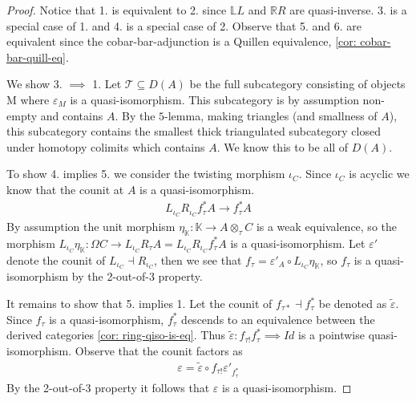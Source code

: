 \documentclass[../thesis.tex]{subfiles}
\begin{document}
            \begin{proof}
                Notice that 1. is equivalent to 2. since $\mathbb{L}L$ and $\mathbb{R}R$ are quasi-inverse. 3. is a special case of 1. and 4. is a special case of 2. Observe that 5. and 6. are equivalent since the cobar-bar-adjunction is a Quillen equivalence, \ref{cor: cobar-bar-quill-eq}.

                We show 3. $\implies$ 1. Let $\mathcal{T}\subseteq D(A)$ be the full subcategory consisting of objects M where $\varepsilon_M$ is a quasi-isomorphism. This subcategory is by assumption non-empty and contains $A$. By the $5$-lemma, making triangles (and smallness of $A$), this subcategory contains the smallest thick triangulated subcategory closed under homotopy colimits which contains $A$. We know this to be all of $D(A)$.

                To show 4. implies 5. we consider the twisting morphism $\iota_C$. Since $\iota_C$ is acyclic we know that the counit at $A$ is a quasi-isomorphism. 
                \begin{align*}
                    L_{\iota_C}R_{\iota_C}f_{\tau}^*A \rightarrow f_\tau^*A
                \end{align*}
                By assumption the unit morphism $\eta_\mathbb{K} : \mathbb{K} \rightarrow A \otimes_\tau C$ is a weak equivalence, so the morphism $L_{\iota_C}\eta_\mathbb{K} : \Omega C \rightarrow L_{\iota_C}R_\tau A = L_{\iota_C}R_{\iota_C}f_\tau^* A$ is a quasi-isomorphism. Let $\varepsilon'$ denote the counit of $L_{\iota_C} \dashv R_{\iota_C}$, then we see that $f_\tau = \varepsilon'_A \circ L_{\iota_C}\eta_\mathbb{K}$, so $f_\tau$ is a quasi-isomorphism by the 2-out-of-3 property.

                It remains to show that 5. implies 1. Let the counit of $f_{\tau *} \dashv f_\tau^*$ be denoted as $\tilde{\varepsilon}$. Since $f_\tau$ is a quasi-isomorphism, $f_\tau^*$ descends to an equivalence between the derived categories \ref{cor: ring-qiso-is-eq}. Thus $\tilde{\varepsilon} : f_{\tau !}f_\tau^* \implies Id$ is a pointwise quasi-isomorphism. Observe that the counit factors as
                \begin{align*}
                    \varepsilon = \tilde{\varepsilon} \circ f_{\tau !}\varepsilon'_{f_\tau^*}
                \end{align*}
                By the 2-out-of-3 property it follows that $\varepsilon$ is a quasi-isomorphism.
            \end{proof}
\end{document}
